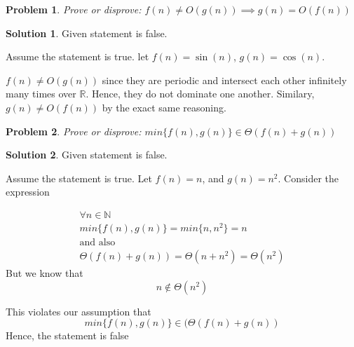 \documentclass[11pt]{article}
\newtheorem*{problem}{Problem}
\theoremstyle{definition}
\newtheorem*{solution}{Solution}
\begin{document}
\begin{problem}
    Prove or disprove: $f(n) \neq O(g(n)) \implies g(n) = O(f(n))$
\end{problem}
\begin{solution}
    Given statement is false.

    Assume the statement is true. let $f(n) = \sin(n)$, $g(n) = \cos(n)$.

    $f(n) \neq O(g(n))$ since they are periodic and intersect each other
    infinitely many times over $\mathbb R$. Hence, they do not dominate
    one another. Similary, $g(n) \neq O(f(n))$ by the exact same reasoning.
\end{solution}


\begin{problem}
    Prove or disprove: $min \{ f(n), g(n) \} \in \Theta(f(n) + g(n))$
\end{problem}
\begin{solution}
    Given statement is false.

    Assume the statement is true. Let $f(n) = n$, and $g(n) = n^2$. Consider the expression

    \begin{gather*}
        \forall n \in \mathbb N \\
        min \{f(n), g(n) \} = min \{n, n^{2} \} = n \\
        \text{and also} \\
        \Theta(f(n) + g(n)) = \Theta(n + n^{2}) = \Theta(n^{2})
    \end{gather*}
    But we know that
    $$
    n \notin \Theta(n^{2})
    $$

    This violates our assumption that 
    $$
    min \{ f(n), g(n) \} \in (\Theta(f(n) + g(n))
    $$
    Hence, the statement is false
\end{solution}
\end{document}
